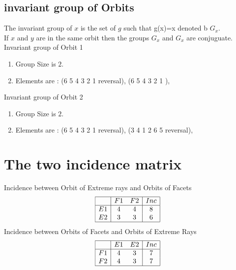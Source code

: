 \documentclass[12pt]{article}
\begin{document}
\subsection{invariant group of Orbits}
\noindent The invariant group of $x$ is the set of $g$ such that g(x)=x denoted b $G_x$.\\
If $x$ and $y$ are in the same orbit then the groups $G_x$ and  $G_x$ are conjuguate.\\
Invariant group of Orbit 1
\begin{enumerate}
\item Group Size is $2$.
\item Elements are : (6 5 4 3 2 1  reversal), (6 5 4 3 2 1 ), 
\end{enumerate}
Invariant group of Orbit 2
\begin{enumerate}
\item Group Size is $2$.
\item Elements are : (6 5 4 3 2 1  reversal), (3 4 1 2 6 5  reversal), 
\end{enumerate}
\section{The two incidence matrix}
Incidence between Orbit of Extreme rays and Orbits of Facets
\begin{equation*}
\begin{array}{|c|cc|c|}
\hline
&F1&F2&Inc\\
\hline
E1&4&4&8\\
E2&3&3&6\\
\hline
\end{array}
\end{equation*}
Incidence between Orbits of Facets and Orbits of Extreme Rays
\begin{equation*}
\begin{array}{|c|cc|c|}
\hline
&E1&E2&Inc\\
\hline
F1&4&3&7\\
F2&4&3&7\\
\hline
\end{array}
\end{equation*}
\end{document}
